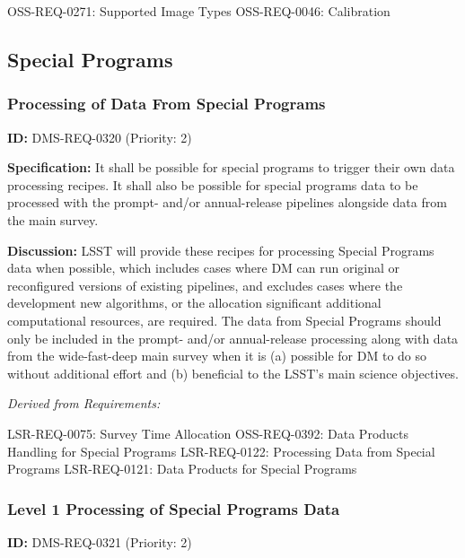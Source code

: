 \documentclass[SE,toc,lsstdraft]{lsstdoc}
\begin{document}
OSS-REQ-0271:
Supported Image Types \newline
OSS-REQ-0046:
Calibration \newline

\subsection{Special Programs}

\subsubsection{Processing of Data From Special Programs}

\label{DMS-REQ-0320}
\textbf{ID:} DMS-REQ-0320 (Priority: 2)

\textbf{Specification:}
It shall be possible for special programs to trigger their own data processing recipes. It shall also be possible for special programs data to be processed with the prompt- and/or annual-release pipelines alongside data from the main survey.

\textbf{Discussion:}
LSST will provide these recipes for processing Special Programs data when possible, which includes cases where DM can run original or reconfigured versions of existing pipelines, and excludes cases where the development new algorithms, or the allocation significant additional computational resources, are required. The data from Special Programs should only be included in the prompt- and/or annual-release processing along with data from the wide-fast-deep main survey when it is (a) possible for DM to do so without additional effort and (b) beneficial to the LSST's main science objectives.

\emph{Derived from Requirements:}

LSR-REQ-0075:
Survey Time Allocation \newline
OSS-REQ-0392:
Data Products Handling for Special Programs \newline
LSR-REQ-0122:
Processing Data from Special Programs \newline
LSR-REQ-0121:
Data Products for Special Programs \newline

\subsubsection{Level 1 Processing of Special Programs Data}

\label{DMS-REQ-0321}
\textbf{ID:} DMS-REQ-0321 (Priority: 2)
\end{document}
